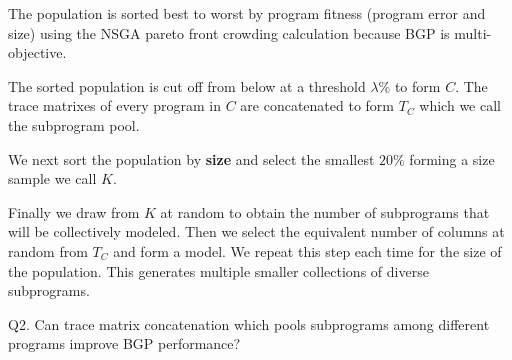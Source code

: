 \begin{inparaenum}
\item The population is sorted best to worst by program fitness (program error and size) using the NSGA pareto front crowding calculation because BGP is multi-objective.

\item The sorted population is cut off from below at a threshold $\lambda \%$ to form $C$.  The trace matrixes of every program in $C$ are concatenated to form $T_C$ which we call the subprogram pool.  

\item We next sort the population by \textbf{size} and select the smallest $20\%$ forming a size sample we call $K$.
   
\item Finally we draw from $K$ at random to obtain the number of subprograms that will be collectively modeled. Then we select the equivalent number of columns at random from $T_C$ and form a model. We repeat this step each time for the size of the population.  This generates multiple smaller collections of diverse subprograms. 

\end{inparaenum}

\noindent Q2. Can trace matrix concatenation which pools subprograms among different programs improve BGP performance?


%





